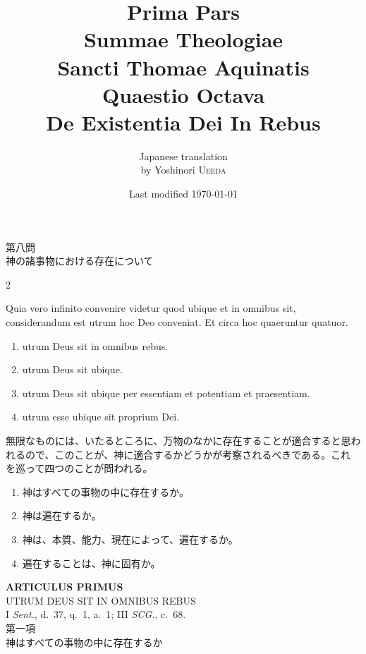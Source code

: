 \documentclass[paper=a4paper,fontsize=10pt,jafontsize=9pt,titlepage]{jlreq}
\title{{\bfseries Prima Pars}\\{\Huge Summae Theologiae}\\Sancti Thomae
Aquinatis\\Quaestio Octava\\{\bfseries De Existentia Dei In Rebus}}
\author{Japanese translation\\by Yoshinori {\scshape Ueeda}}
\date{Last modified \today}
\begin{document}
\maketitle
\begin{center}
{\Large 第八問\\神の諸事物における存在について}
\end{center}



\begin{paracol}{2}

Quia vero infinito convenire videtur quod ubique et in omnibus sit,
 considerandum est utrum hoc Deo conveniat. Et circa hoc quaeruntur
 quatuor. 
\begin{enumerate}
 \item utrum Deus sit in omnibus rebus.
 \item utrum Deus sit ubique.
 \item utrum Deus sit ubique per essentiam et potentiam et praesentiam.
 \item utrum esse ubique sit proprium Dei.
\end{enumerate}

\switchcolumn

無限なものには、いたるところに、万物のなかに存在することが適合すると思わ
 れるので、このことが、神に適合するかどうかが考察されるべきである。これ
 を巡って四つのことが問われる。
\begin{enumerate}
 \item 神はすべての事物の中に存在するか。
 \item 神は遍在するか。
 \item 神は、本質、能力、現在によって、遍在するか。
 \item 遍在することは、神に固有か。
\end{enumerate}

\end{paracol}

\newpage
{}
\begin{center}
 {\Large {\bfseries ARTICULUS PRIMUS}}\\
 {\large UTRUM DEUS SIT IN OMNIBUS REBUS}\\
 {\footnotesize I {\itshape Sent.}, d.~37, q.~1, a.~1; III {\itshape
 SCG.}, c.~68.}\\
 {\Large 第一項\\神はすべての事物の中に存在するか}
\end{center}

{}
\setcounter{section}{1}
\setcounter{subsection}{0}
\end{document}
